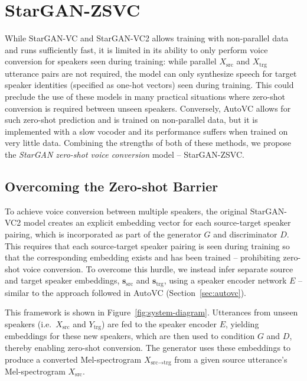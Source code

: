 \section{StarGAN-ZSVC}
\label{sec:starganzsvc}

While StarGAN-VC and StarGAN-VC2 allows training with non-parallel data and runs sufficiently fast, it is limited in its ability to only perform voice conversion for speakers seen during training: while parallel $X_{\text{src}}$ and $X_{\text{trg}}$ utterance pairs are not required, the model can only synthesize speech for target speaker identities (specified as one-hot vectors) seen during training.
This could preclude the use of these models in many practical situations where zero-shot conversion is required between unseen speakers.
Conversely, AutoVC allows for such zero-shot prediction and is trained on non-parallel data, but it is implemented with a slow vocoder and
its performance suffers when trained on very little data. Combining the strengths of both of these methods, we propose the \textit{StarGAN zero-shot voice conversion} model -- StarGAN-ZSVC.

\subsection{Overcoming the Zero-shot Barrier}
To achieve voice conversion between multiple speakers, the original StarGAN-VC2 model creates an explicit embedding vector for each source-target speaker pairing, which is incorporated
as part of the generator $G$ and discriminator $D$.
This requires that each source-target speaker pairing is seen during training so that the corresponding embedding exists and has been trained -- prohibiting zero-shot voice conversion.
To overcome this hurdle, we instead infer separate source and target speaker embeddings, $\mathbf{s}_{\text{src}}$ and $\mathbf{s}_{\text{trg}}$, using a speaker encoder network $E$ -- similar to the approach followed in AutoVC (Section~\ref{sec:autovc}).

This framework is shown in Figure~\ref{fig:system-diagram}.
Utterances from unseen speakers (i.e.\  $X_{\text{src}}$ and $Y_{\text{trg}}$) are fed to the speaker encoder $E$, yielding embeddings for these new speakers, which are then used to condition $G$ and $D$, 
thereby enabling zero-shot conversion. 
The generator uses these embeddings to produce a converted Mel-spectrogram $X_{\text{src}\rightarrow \text{trg}}$ from a given source utterance's Mel-spectrogram $X_{\text{src}}$.


